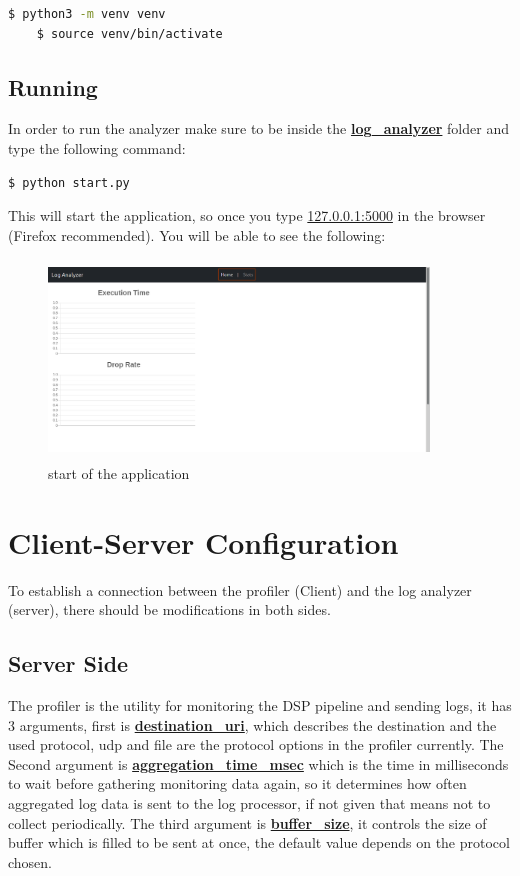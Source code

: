 \begin{lstlisting}[language=bash]
	$ python3 -m venv venv	
	$ source venv/bin/activate
\end{lstlisting}


\subsection{Running} %
In order to run the analyzer make sure to be inside the
\textbf{\url{log_analyzer}} folder and type the following
command:

\begin{lstlisting}[language=bash]
	$ python start.py
\end{lstlisting}

This will start the application, so once you type \url{127.0.0.1:5000}
in the browser (Firefox recommended). You will be able to see the following:

\begin{figure}[H]
	\centering
	\includegraphics[width=0.9\textwidth,height=200px]{images/start.png}
	\caption{start of the application}
	\label{fig:empty_page}
\end{figure}

\section{Client-Server Configuration} %
To establish a connection between the profiler (Client)
and the log analyzer (server), there should be modifications in both
sides.

\subsection{Server Side}

The profiler is the utility for monitoring the DSP pipeline and sending logs,
it has 3 arguments, first is \textbf{\url{destination_uri}},
which describes the destination and the used protocol, udp and file
are the protocol options in the profiler currently. The Second argument
is \textbf{\url{aggregation_time_msec}} which is the time in milliseconds to wait 
before gathering monitoring data again, so it determines how often aggregated
log data is sent to the log processor, if not given that means not to collect
periodically. The third argument is \textbf{\url{buffer_size}}, it controls the size
of buffer which is filled to be sent at once, the default value depends on the
protocol chosen.

